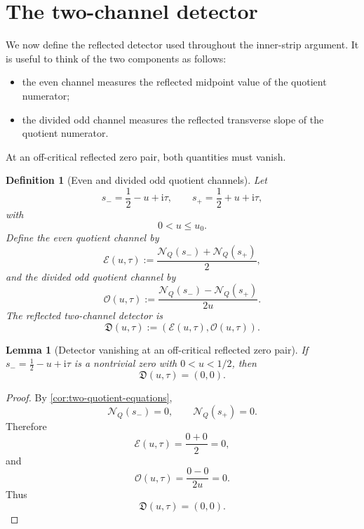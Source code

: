 \documentclass[11pt]{article}
\newtheorem{lemma}[theorem]{Lemma}
\newtheorem{definition}[theorem]{Definition}
\newcommand{\ii}{\mathrm{i}}
\newcommand{\NQ}{\mathcal N_Q}
\newcommand{\Ech}{\mathcal E}
\newcommand{\Och}{\mathcal O}
\newcommand{\Dvec}{\mathfrak D}
\begin{document}

\section{The two-channel detector}
\label{sec:two-channel-detector}

We now define the reflected detector used throughout the inner-strip argument.
It is useful to think of the two components as follows:

\begin{itemize}[leftmargin=2.2em]
    \item the even channel measures the reflected midpoint value of the
    quotient numerator;

    \item the divided odd channel measures the reflected transverse slope of
    the quotient numerator.
\end{itemize}

At an off-critical reflected zero pair, both quantities must vanish.

\begin{definition}[Even and divided odd quotient channels]
\label{def:two-channel-detector}
Let
\[
        s_-=\frac12-u+\ii\tau,
        \qquad
        s_+=\frac12+u+\ii\tau,
\]
with
\[
        0<u\le u_0.
\]
Define the even quotient channel by
\[
        \Ech(u,\tau)
        :=
        \frac{\NQ(s_-)+\NQ(s_+)}{2},
\]
and the divided odd quotient channel by
\[
        \Och(u,\tau)
        :=
        \frac{\NQ(s_-)-\NQ(s_+)}{2u}.
\]
The reflected two-channel detector is
\[
        \Dvec(u,\tau)
        :=
        \left(
        \Ech(u,\tau),
        \Och(u,\tau)
        \right).
\]
\end{definition}

\begin{lemma}[Detector vanishing at an off-critical reflected zero pair]
\label{lem:detector-vanishing}
If \(s_-=\frac12-u+\ii\tau\) is a nontrivial zero with \(0<u<1/2\), then
\[
        \Dvec(u,\tau)=(0,0).
\]
\end{lemma}

\begin{proof}
By \cref{cor:two-quotient-equations},
\[
        \NQ(s_-)=0,
        \qquad
        \NQ(s_+)=0.
\]
Therefore
\[
        \Ech(u,\tau)
        =
        \frac{0+0}{2}
        =
        0,
\]
and
\[
        \Och(u,\tau)
        =
        \frac{0-0}{2u}
        =
        0.
\]
Thus
\[
        \Dvec(u,\tau)=(0,0).
\]
\end{proof}
\end{document}
